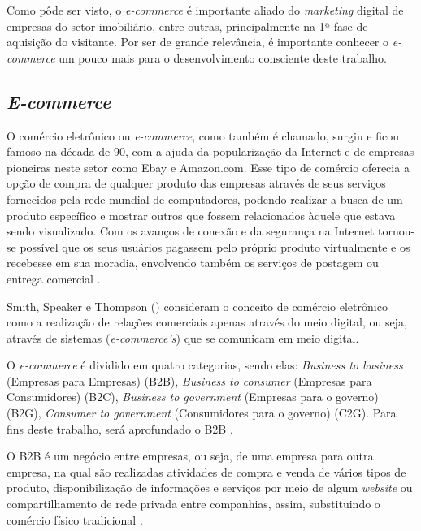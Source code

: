 Como pôde ser visto, o \textit{e-commerce} é importante aliado do \textit{marketing} digital de empresas do setor imobiliário, entre outras, principalmente na 1ª fase de aquisição do visitante. Por ser de grande relevância, é importante conhecer o \textit{e-commerce} um pouco mais para o desenvolvimento consciente deste trabalho.

\subsection{\textit{E-commerce}}

O comércio eletrônico ou \textit{e-commerce}, como também é chamado, surgiu e ficou famoso na década de 90, com a ajuda da popularização da Internet e de empresas pioneiras neste setor como Ebay e Amazon.com. Esse tipo de comércio oferecia a opção de compra de qualquer produto das empresas através de seus serviços fornecidos pela rede mundial de computadores, podendo realizar a busca de um produto específico e mostrar outros que fossem relacionados àquele que estava sendo visualizado. Com os avanços de conexão e da segurança na Internet tornou-se possível que os seus usuários pagassem pelo próprio produto virtualmente e os recebesse em sua moradia, envolvendo também os serviços de postagem ou entrega comercial \cite{Nakamura:2011}.

Smith, Speaker e Thompson (\citeyear{smith2000mais}) consideram o conceito de comércio eletrônico como a realização de relações comerciais apenas através do meio digital, ou seja, através de sistemas (\textit{e-commerce's}) que se comunicam em meio digital.

O \textit{e-commerce} é dividido em quatro categorias, sendo elas: \textit{Business to business} (Empresas para Empresas) (B2B), \textit{Business to consumer} (Empresas para Consumidores) (B2C), \textit{Business to government} (Empresas para o governo) (B2G), \textit{Consumer to government} (Consumidores para o governo) (C2G). Para fins deste trabalho, será aprofundado o B2B \cite{Nakamura:2011}.

O B2B é um negócio entre empresas, ou seja, de uma empresa para outra empresa, na qual são realizadas atividades de compra e venda de vários tipos de produto, disponibilização de informações e serviços por meio de algum \textit{website} ou compartilhamento de rede privada entre companhias, assim, substituindo o comércio físico tradicional \cite{Nakamura:2011}.

